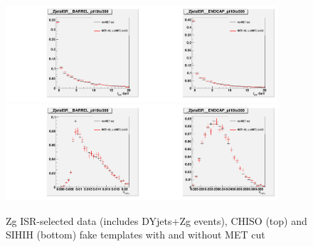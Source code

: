 \begin{figure}[htb]
  \begin{center}
  \includegraphics[width=0.45\textwidth]{../figs/figs_v11/ChannelsMERGED_ZGamma/QuickChecks/cTemplatesVsWMt_ZjetsISR_phoPFChIsoCorr_BARREL_pt10to500.pdf}\includegraphics[width=0.45\textwidth]{../figs/figs_v11/ChannelsMERGED_ZGamma/QuickChecks/cTemplatesVsWMt_ZjetsISR_phoPFChIsoCorr_ENDCAP_pt10to500.pdf}\\
  \includegraphics[width=0.45\textwidth]{../figs/figs_v11/ChannelsMERGED_ZGamma/QuickChecks/cTemplatesVsWMt_ZjetsISR_phoSigmaIEtaIEta_BARREL_pt10to500.pdf}\includegraphics[width=0.45\textwidth]{../figs/figs_v11/ChannelsMERGED_ZGamma/QuickChecks/cTemplatesVsWMt_ZjetsISR_phoSigmaIEtaIEta_ENDCAP_pt10to500.pdf}\\
  \caption{Zg ISR-selected data (includes DYjets+Zg events), CHISO (top) and SIHIH (bottom) fake templates with and without MET cut}
  \label{fig:templatesVsWMt_Zg_CHISO_fake}
  \end{center}
\end{figure}


